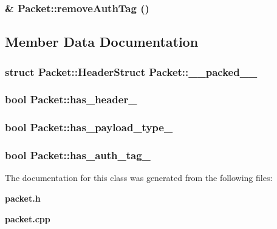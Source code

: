 \subsubsection{ \& Packet::remove\-Auth\-Tag ()}\label{classPacket_3e3dfca708baf59791f0608b8a57924c}




\subsection{Member Data Documentation}
\subsubsection{\setlength{\rightskip}{0pt plus 5cm}struct {\bf Packet::Header\-Struct} {\bf Packet::\_\-\_\-packed\_\-\_\-}\hspace{0.3cm}{\tt  [private]}}\label{classPacket_11b3534f67df6bb19963e6bc8090230b}


\subsubsection{\setlength{\rightskip}{0pt plus 5cm}bool {\bf Packet::has\_\-header\_\-}\hspace{0.3cm}{\tt  [private]}}\label{classPacket_97b8eb52e7476174a0e91e2ccaf73306}


\subsubsection{\setlength{\rightskip}{0pt plus 5cm}bool {\bf Packet::has\_\-payload\_\-type\_\-}\hspace{0.3cm}{\tt  [private]}}\label{classPacket_235c6c8c7362c46ca33a331713199a17}


\subsubsection{\setlength{\rightskip}{0pt plus 5cm}bool {\bf Packet::has\_\-auth\_\-tag\_\-}\hspace{0.3cm}{\tt  [private]}}\label{classPacket_849a965c46afc5fa7efe257212197abb}




The documentation for this class was generated from the following files:\begin{CompactItemize}
\item 
{\bf packet.h}\item 
{\bf packet.cpp}\end{CompactItemize}

